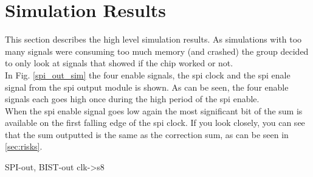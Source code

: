 \section{Simulation Results} \label{sec:simulation_results}
This section describes the high level simulation results. As simulations with too many signals were consuming too much memory (and crashed) the group decided to only look at signals that showed if the chip worked or not.\\






In Fig. \ref{spi_out_sim} the four enable signals, the spi clock and the spi enale signal from the spi output module is shown. As can be seen, the four enable signals each goes high once during the high period of the spi enable.\\
When the spi enable signal goes low again the most significant bit of the sum is available on the first falling edge of the spi clock. If you look closely, you can see that the sum outputted is the same as the correction sum, as can be seen in \ref{sec:risks}.

SPI-out, BIST-out clk->s8
